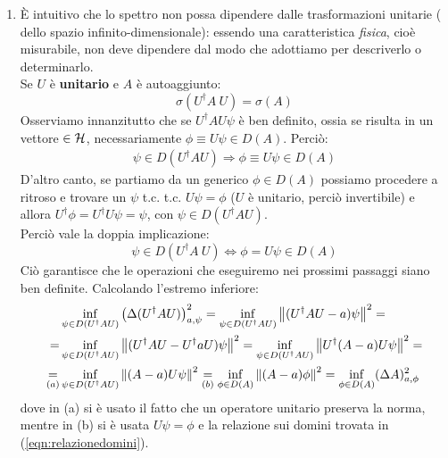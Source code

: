 \documentclass[../../FisicaTeorica.tex]{subfiles}
\begin{document}
\begin{enumerate}
	\item È intuitivo che lo spettro non possa dipendere dalle trasformazioni unitarie ( dello spazio infinito-dimensionale): essendo una caratteristica \textit{fisica}, cioè misurabile, non deve dipendere dal modo che adottiamo per descriverlo o determinarlo.\\
	Se $U$ è \textbf{unitario} e $A$ è autoaggiunto:
	\[
	\sigma \left(U^\dag A\ U\right)= \sigma \left(A\right)
	\]
	Osserviamo innanzitutto che se $U^\dag A U\psi$ è ben definito, ossia se risulta in un vettore $\in \mathcal{H}$, necessariamente  $\phi \equiv U\psi \in D(A)$. Perciò:
	\begin{align}
	    \psi \in D(U^\dag A U) \Rightarrow \phi \equiv U\psi \in D(A)
	\end{align}
	D'altro canto, se partiamo da un generico $\phi \in D(A)$ possiamo procedere a ritroso e trovare un $\psi$ t.c.  t.c. $U\psi =\phi$ ($U$ è unitario, perciò invertibile) e allora $U^\dag\phi =U^\dag U \psi =\psi$, con $\psi \in D(U^\dag A U)$.\\
	Perciò vale la doppia implicazione:
	\begin{equation}
	    \psi \in D\left(U^\dag A\ U\right)\Leftrightarrow \phi =U\psi \in D(A)
	    \label{eqn:relazionedomini}
	\end{equation}
	Ciò garantisce che le operazioni che eseguiremo nei prossimi passaggi siano ben definite. Calcolando l'estremo inferiore:
	\begin{align*}
	   &\inf_{\psi \in D(U^\dag A U)} \left (\Delta(U^\dag A U) \right )^2_{a,\psi}
	   =\inf_{\psi \in D(U^\dagger A U)} \left\lVert(U^\dag A U-a)\psi\right\rVert^2 =\\
	   = &\inf_{\psi \in D(U^\dag A U)} \left\lVert(U^\dag A U - U^\dag a U)\psi\right\rVert^2 = \inf_{\psi \in D(U^\dagger A U)} \left\lVert U^\dag(A-a)U\psi\right\rVert^2 =\\
	   \underset{(a)}{=} &\inf_{\psi \in D(U^\dagger A U)} \left\lVert(A-a)U\psi\right\rVert^2 \underset{(b)}{=} \inf_{\phi \in D(A)} \left\lVert(A-a)\phi\right\rVert^2 = \inf_{\phi \in D(A)} (\Delta A)^2_{a,\phi}
	\end{align*}
	dove in (a) si è usato il fatto che un operatore unitario preserva la norma, mentre in (b) si è usata $U\psi = \phi$ e la relazione sui domini trovata in (\ref{eqn:relazionedomini}).
	

\end{enumerate}
\end{document}
